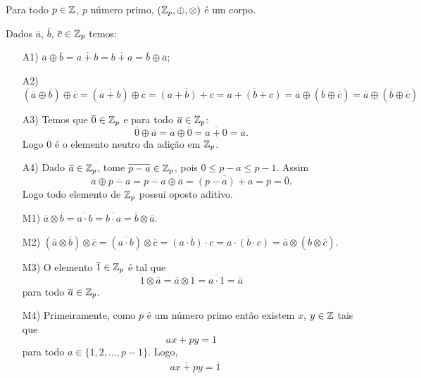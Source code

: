 \begin{teorema}
	Para todo $p \in \mathbb{Z}$, $p$ n\'umero primo, $(\mathbb{Z}_p, \oplus, \otimes)$ \'e um corpo.
\end{teorema}
\begin{prova}
	Dados $\overline{a}$, $\overline{b}$, $\overline{c} \in \mathbb{Z}_p$ temos:
	\begin{enumerate}
		\item[A1)] $\overline{a} \oplus \overline{b} = \overline{a + b} = \overline{b + a} = \overline{b} \oplus \overline{a}$;
		\item[A2)] $(\overline{a} \oplus \overline{b}) \oplus \overline{c} = (\overline{a + b}) \oplus \overline{c} = \overline{(a + b) + c} = \overline{a + (b + c)} = \overline{a} \oplus (\overline{b} \oplus \overline{c}) = \overline{a} \oplus (\overline{b} \oplus \overline{c})$
		\item[A3)] Temos que $\overline{0} \in \mathbb{Z}_p$ e para todo $\overline{a} \in \mathbb{Z}_p$:
		\[
		  \overline{0} \oplus \overline{a} = \overline{a} \oplus \overline{0} = \overline{a + 0} = \overline{a}.
		\]
		Logo $\overline{0}$ \'e o elemento neutro da adi\c{c}\~ao em $\mathbb{Z}_p$.
		\item[A4)] Dado $\overline{a} \in \mathbb{Z}_p$, tome $\overline{p - a} \in \mathbb{Z}_p$, pois $0 \le p - a \le p - 1$. Assim
		\[
		  \overline{a} \oplus \overline{p - a} = \overline{p - a} \oplus \overline{a} = \overline{(p - a) + a} = \overline{p} = \overline{0}.
		\]
		Logo todo elemento de $\mathbb{Z}_p$ possui oposto aditivo.
		\item[M1)] $\overline{a} \otimes \overline{b} = \overline{a\cdot b} = \overline{b \cdot a} = \overline{b} \otimes \overline{a}$.
		\item[M2)] $(\overline{a} \otimes \overline{b}) \otimes \overline{c} = (\overline{a\cdot b}) \otimes \overline{c} = \overline{(a\cdot b) \cdot c} = 
		\overline{a\cdot (b\cdot c)} = \overline{a} \otimes (\overline{b} \otimes \overline{c})$.
		\item[M3)] O elemento $\overline{1} \in \mathbb{Z}_p$ \'e tal que
		\[
		  \overline{1} \otimes \overline{a} = \overline{a} \otimes \overline{1} = \overline{a\cdot 1} = \overline{a}
		\]
		para todo $\overline{a} \in \mathbb{Z}_p$.
		\item[M4)] Primeiramente, como $p$ \'e um n\'umero primo ent\~ao existem $x$, $y \in \mathbb{Z}$ tais que
		\[
		  ax + py = 1
		\]
		para todo $a \in \{1, 2, \dots, p - 1\}$. Logo,
		\begin{align*}
			&\overline{ax + py} = \overline{1}\\

\end{align*}
\end{enumerate}
\end{prova}
